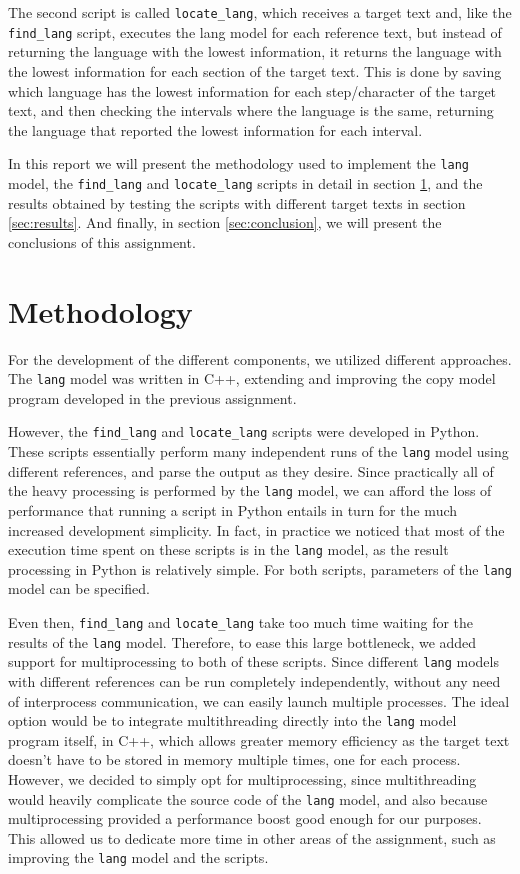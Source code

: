 \documentclass{article}
\begin{document}
The second script is called \texttt{locate_lang}, which receives a target text and, like the \texttt{find_lang} script, executes the lang model for each reference text, but instead of returning the language with the lowest information, it returns the language with the lowest information for each section of the target text.
This is done by saving which language has the lowest information for each step/character of the target text, and then checking the intervals where the language is the same, returning the language that reported the lowest information for each interval.

In this report we will present the methodology used to implement the \texttt{lang} model, the \texttt{find_lang} and \texttt{locate_lang} scripts in detail in section \ref{sec:methodology}, and the results obtained by testing the scripts with different target texts in section \ref{sec:results}.
And finally, in section \ref{sec:conclusion}, we will present the conclusions of this assignment.

\section{Methodology}
\label{sec:methodology}

For the development of the different components, we utilized different approaches.
The \texttt{lang} model was written in C++, extending and improving the copy model program developed in the previous assignment.

However, the \texttt{find_lang} and \texttt{locate_lang} scripts were developed in Python.
These scripts essentially perform many independent runs of the \texttt{lang} model using different references, and parse the output as they desire.
Since practically all of the heavy processing is performed by the \texttt{lang} model, we can afford the loss of performance that running a script in Python entails in turn for the much increased development simplicity.
In fact, in practice we noticed that most of the execution time spent on these scripts is in the \texttt{lang} model, as the result processing in Python is relatively simple.
For both scripts, parameters of the \texttt{lang} model can be specified.

Even then, \texttt{find_lang} and \texttt{locate_lang} take too much time waiting for the results of the \texttt{lang} model.
Therefore, to ease this large bottleneck, we added support for multiprocessing to both of these scripts.
Since different \texttt{lang} models with different references can be run completely independently, without any need of interprocess communication, we can easily launch multiple processes.
The ideal option would be to integrate multithreading directly into the \texttt{lang} model program itself, in C++, which allows greater memory efficiency as the target text doesn't have to be stored in memory multiple times, one for each process.
However, we decided to simply opt for multiprocessing, since multithreading would heavily complicate the source code of the \texttt{lang} model, and also because multiprocessing provided a performance boost good enough for our purposes.
This allowed us to dedicate more time in other areas of the assignment, such as improving the \texttt{lang} model and the scripts.
\end{document}

